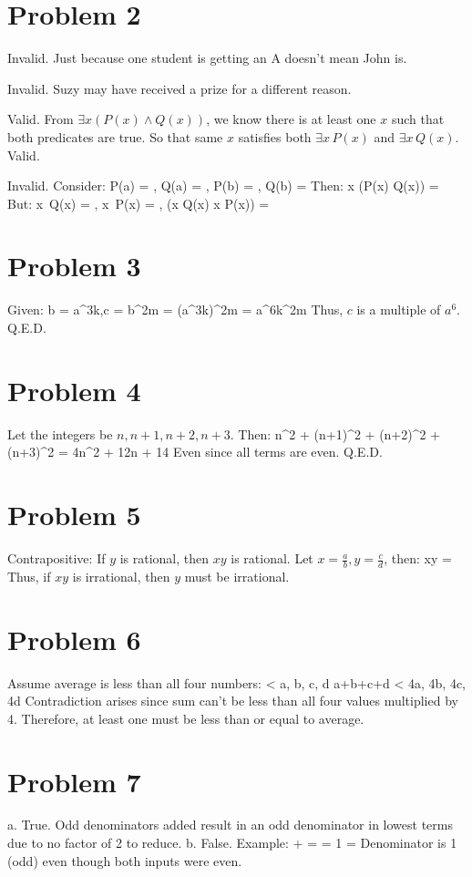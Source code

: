 \section*{Problem 2}
\item Invalid. Just because one student is getting an A doesn’t mean John is.
\item Invalid. Suzy may have received a prize for a different reason.
\item Valid. From \( \exists x (P(x) \land Q(x)) \), we know there is at least one \( x \) such that both predicates are true. So that same \( x \) satisfies both \( \exists x\,P(x) \) and \( \exists x\,Q(x) \). Valid.
\item Invalid. Consider:
P(a) = , Q(a) = , P(b) = , Q(b) = 
Then:
\forall x (P(x) \lor Q(x)) = 
But:
\forall x\, Q(x) = , \forall x\, P(x) = , \Rightarrow (\forall x Q(x) \lor \forall x P(x)) = 
\section*{Problem 3}
Given:
b = a^3k,\quad c = b^2m = (a^3k)^2m = a^6k^2m
Thus, \( c \) is a multiple of \( a^6 \). Q.E.D.
\section*{Problem 4}
Let the integers be \( n, n+1, n+2, n+3 \). Then:
n^2 + (n+1)^2 + (n+2)^2 + (n+3)^2 = 4n^2 + 12n + 14
Even since all terms are even. Q.E.D.
\section*{Problem 5}
Contrapositive: If \( y \) is rational, then \( xy \) is rational.
Let \( x = \frac{a}{b}, y = \frac{c}{d} \), then:
xy =  \in {}
Thus, if \( xy \) is irrational, then \( y \) must be irrational.
\section*{Problem 6}
Assume average is less than all four numbers:
 < a, b, c, d
\Rightarrow a+b+c+d < 4a, 4b, 4c, 4d
Contradiction arises since sum can’t be less than all four values multiplied by 4. Therefore, at least one must be less than or equal to average.
\section*{Problem 7}
a. True. Odd denominators added result in an odd denominator in lowest terms due to no factor of 2 to reduce.
b. False. Example:
 +  =  = 1 = 
Denominator is 1 (odd) even though both inputs were even.
